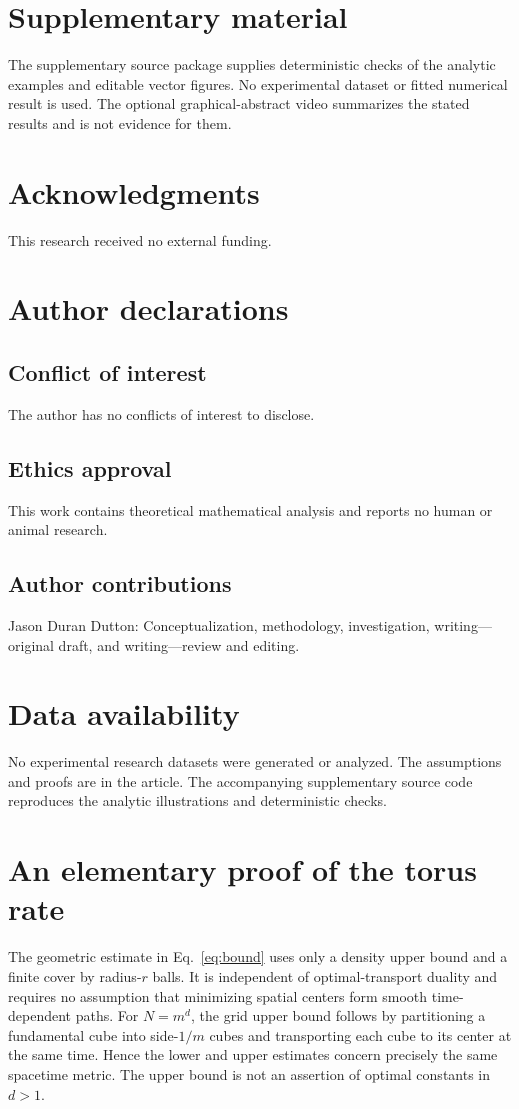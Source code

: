 \documentclass[aip,jmp,reprint,onecolumn,amsmath,amssymb]{revtex4-2}
\theoremstyle{definition}
\begin{document}
\section*{Supplementary material}
The supplementary source package supplies deterministic checks of the analytic examples and editable vector figures. No experimental dataset or fitted numerical result is used. The optional graphical-abstract video summarizes the stated results and is not evidence for them.
\section*{Acknowledgments}
This research received no external funding.
\section*{Author declarations}
\subsection*{Conflict of interest}
The author has no conflicts of interest to disclose.
\subsection*{Ethics approval}
This work contains theoretical mathematical analysis and reports no human or animal research.
\subsection*{Author contributions}
Jason Duran Dutton: Conceptualization, methodology, investigation, writing---original draft, and writing---review and editing.
\section*{Data availability}
No experimental research datasets were generated or analyzed. The assumptions and proofs are in the article. The accompanying supplementary source code reproduces the analytic illustrations and deterministic checks.
\appendix
\section{An elementary proof of the torus rate}
The geometric estimate in Eq.~\eqref{eq:bound} uses only a density upper bound and a finite cover by radius-$r$ balls. It is independent of optimal-transport duality and requires no assumption that minimizing spatial centers form smooth time-dependent paths. For $N=m^d$, the grid upper bound follows by partitioning a fundamental cube into side-$1/m$ cubes and transporting each cube to its center at the same time. Hence the lower and upper estimates concern precisely the same spacetime metric. The upper bound is not an assertion of optimal constants in $d>1$.
\end{document}
